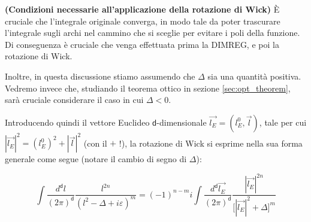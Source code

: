 \documentclass[../main.tex]{subfiles}
\begin{document}
\begin{nota}
    \textbf{(Condizioni necessarie all'applicazione della rotazione di Wick)}
    È cruciale che l'integrale originale converga, in modo tale da poter trascurare l'integrale sugli archi nel cammino che si sceglie per evitare i poli della funzione. Di conseguenza è cruciale che venga effettuata prima la DIMREG, e poi la rotazione di Wick.

    Inoltre, in questa discussione stiamo assumendo che $\Delta$ sia una quantità positiva. Vedremo invece che, studiando il teorema ottico in sezione \ref{sec:opt_theorem}, sarà cruciale considerare il caso in cui $\Delta<0$.
\end{nota}

Introducendo quindi il vettore Euclideo $\mathsf d$-dimensionale $\Vec{l_E}=(l^0_E,\Vec{l})$, tale per cui $|\Vec{l_E}|^2 = ({l^0_E})^2 + |\Vec{l}|^2$ (con il $+$ !), la rotazione di Wick si esprime nella sua forma generale come segue (notare il cambio di segno di $\Delta$):

\begin{equation}
    \boxed{
    \int \frac{d^\mathsf{d} l}{(2\pi)^\mathsf{d}} \frac{l^{2n}}{(l^2 - \Delta + i\varepsilon)^m} = (-1)^{n-m} i \int \frac{d^\mathsf{d} \Vec{l_E}}{(2\pi)^\mathsf{d}} \frac{|\Vec{l_E}|^{2n}}{\bigl[|\Vec{l_E}|^2 + \Delta\bigr]^m}
    }
    \label{eq:wick_rotation}
\end{equation}
\end{document}
